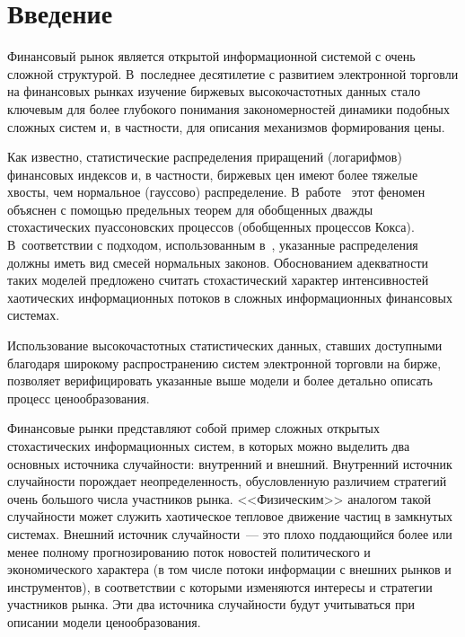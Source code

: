 

      \thispagestyle{headings}

      \begin{multicols}{2}

            \label{st\stat}

\section{Введение}

Финансовый рынок является открытой информационной системой с очень
сложной структурой. В~последнее десятилетие с развитием электронной
торговли на финансовых рынках изучение биржевых высокочастотных
данных стало ключевым для более глубокого понимания закономерностей
динамики подобных сложных систем и, в частности, для описания
механизмов формирования цены.

Как известно, статистические распределения приращений (логарифмов)
финансовых индексов и, в частности, биржевых цен имеют более тяжелые
хвосты, чем нормальное (гауссово) распределение. В~работе~\cite{Korolev2011-1} 
этот феномен объяснен с помощью предельных теорем
для обобщенных дважды стохастических пуассоновских процессов
(обобщенных процессов Кокса). В~соответствии с подходом,
использованным в~\cite{Korolev2011-1}, указанные распределения должны
иметь вид смесей нормальных законов. Обоснованием адекватности таких
моделей предложено считать стохастический характер интенсивностей
хаотических информационных потоков в сложных информационных
финансовых сис\-темах.

Использование высокочастотных статистических данных, ставших
доступными благодаря широ\-ко\-му распространению систем электронной
торгов\-ли на бирже, позволяет верифицировать указанные выше модели и
более детально описать процесс ценообразования.

Финансовые рынки представляют собой пример сложных открытых
стохастических информационных систем, в которых можно выделить два
основных источника случайности: внутренний и внешний. Внутренний
источник случайности порождает неопределенность, обусловленную
различием стратегий очень большого числа участников рынка.
<<Физическим>> аналогом такой слу\-чай\-ности может служить хаотическое
тепловое движение час\-тиц в замкнутых сис\-те\-мах. Внешний источник
случайности~--- это плохо поддающийся более или менее полному
прогнозированию поток новостей политического и экономического
характера (в том числе потоки информации с внешних рынков и
инструментов), в соответствии с которыми изменяются интересы и
стратегии участников рынка. Эти два источника случайности будут
учитываться при описании модели ценообразования.



\end{multicols}
